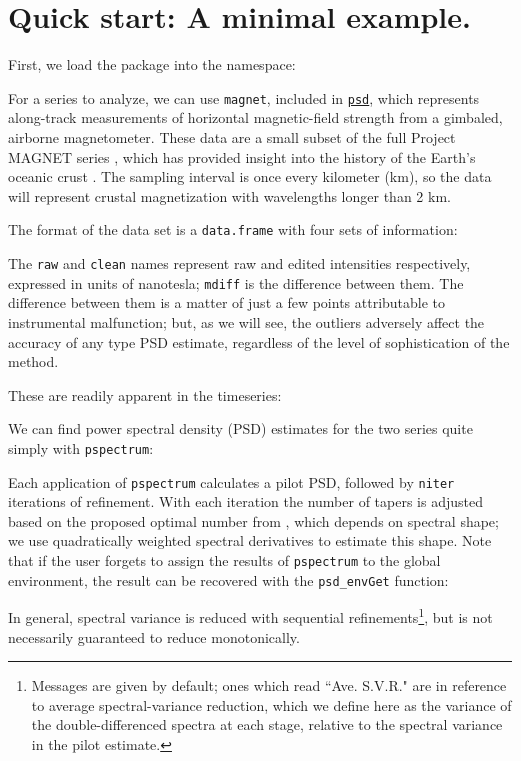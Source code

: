 \documentclass[10pt]{article}\usepackage[]{graphicx}\usepackage[]{color}
\newcommand{\Rcmd}[1]{\texttt{#1}}
\newcommand{\psd}[0]{\href{http://www.github.com/abarbour/psd/}{\color{blue}\Rcmd{psd}}}
\begin{document}
\section{Quick start: A minimal example.}
First, we load the package into the namespace:

For a series to analyze, we can use \Rcmd{magnet}, included in \psd{},
which represents along-track measurements
of horizontal magnetic-field strength from a gimbaled, airborne magnetometer.
These data are a small subset of the full Project MAGNET series \citep{coleman1992},
which has provided insight into
the history of the Earth's oceanic crust 
\citep{parker1997, obrien1999, korte2002}.
The sampling interval is
once every kilometer (km), so the data will represent
crustal magnetization with wavelengths longer than 2 km.

The format of the data set is a \Rcmd{data.frame} with four
sets of information:

The \Rcmd{raw} and \Rcmd{clean} names represent raw
and edited intensities respectively, expressed in units of nanotesla; 
\Rcmd{mdiff} is the difference between them.
The difference between them is a matter of just a few points
attributable to instrumental malfunction; but, as we will see, the
outliers adversely affect the accuracy of any type PSD estimate, regardless
of the level of sophistication of the method.

These are readily apparent in the timeseries:



We can find power spectral density (PSD)
estimates for the two series quite simply with \Rcmd{pspectrum}:

Each application of \Rcmd{pspectrum} calculates a pilot PSD, followed by 
\Rcmd{niter}
iterations of refinement.
With each iteration
the number of tapers is adjusted 
based on the proposed optimal number from \citet{rs1995}, which
depends on spectral shape; we use 
quadratically weighted spectral derivatives \citep{prieto2007}
to estimate this shape.
Note that if the user forgets to assign the results of
\Rcmd{pspectrum} to the global environment, the result can
be recovered with the \Rcmd{psd\_envGet} function:


In general, spectral variance is reduced
with sequential refinements\footnote{
  Messages are given by default; ones which read
  ``Ave. S.V.R." are in reference to 
  average spectral-variance reduction, which
  we define here as the variance of the
  double-differenced spectra at each stage, relative
  to the spectral variance in the pilot estimate.
}, but is not necessarily guaranteed to reduce monotonically.
\end{document}

